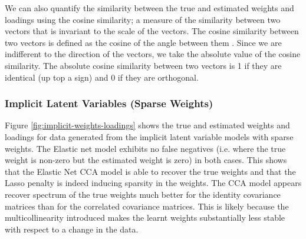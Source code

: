 We can also quantify the similarity between the true and estimated weights and \gls{loadings} using the cosine similarity; a measure of the similarity between two vectors that is invariant to the scale of the vectors.
The cosine similarity between two vectors is defined as the cosine of the angle between them \citep{luo2018cosine}.
Since we are indifferent to the direction of the vectors, we take the absolute value of the cosine similarity.
The absolute cosine similarity between two vectors is 1 if they are identical (up top a sign) and 0 if they are orthogonal.

\subsubsection{Implicit Latent Variables (Sparse Weights)}

Figure \ref{fig:implicit-weights-loadings} shows the true and estimated weights and \gls{loadings} for data generated from the implicit latent variable models with sparse weights.
The Elastic net model exhibits no false negatives (i.e. where the true weight is non-zero but the estimated weight is zero) in both cases.
This shows that the Elastic Net CCA model is able to recover the true weights and that the Lasso penalty is indeed inducing sparsity in the weights.
The CCA model appears recover spectrum of the true weights much better for the identity covariance matrices than for the correlated covariance matrices.
This is likely because the multicollinearity introduced makes the learnt weights substantially less stable with respect to a change in the data.


